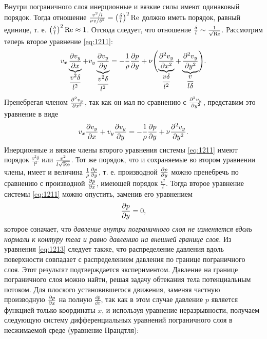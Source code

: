 	Внутри пограничного слоя инерционные и вязкие силы имеют одинаковый порядок. Тогда отношение $\frac{v^2/l}{\nu v/\delta^2} = \left(\frac{\delta}{l}\right)^2\mathrm{Re}$ должно иметь порядок, равный единице, т. е. $\left(\frac{\delta}{l}\right)^2\mathrm{Re} \approx 1$. Отсюда следует, что отношение $\frac{\delta}{l} \sim \frac{1}{\sqrt{\mathrm{Re}}}$.\n
	Рассмотрим теперь второе уравнение \eqref{eq:1211}:
	\begin{gather*}
		v_x\underbrace{\frac{\partial v_y}{\partial x}}_{\dfrac{v^2\delta}{l^2}} + v_y\underbrace{\frac{\partial v_y}{\partial y}}_{\dfrac{v^2\delta}{l^2}} = -\frac{1}{\rho}\frac{\partial p}{\partial y} + \nu\Biggl(\underbrace{\frac{\partial^2 v_y}{\partial x^2}}_{\dfrac{v\delta}{l^2}} + \underbrace{\frac{\partial^2 v_y}{\partial y^2}}_{\dfrac{v}{l\delta}}\Biggr).
	\end{gather*}\n
	Пренебрегая членом $\frac{\partial^2 v_y}{\partial x^2}$, так как он мал по сравнению с $\frac{\partial^2 v_y}{\partial y^2}$, представим это уравнение в виде
	\begin{gather}\label{eq:1212}
		v_x\frac{\partial v_y}{\partial x} + v_y\frac{\partial v_y}{\partial y} = -\frac{1}{\rho}\frac{\partial p}{\partial y} + \nu\frac{\partial^2 v_y}{\partial y^2}.
	\end{gather}\n
	Инерционные и вязкие члены второго уравнения системы \eqref{eq:1211} имеют порядок $\frac{v^2\delta}{l^2}$ или $\frac{v^2}{l\sqrt{\mathrm{Re}}}$.\n
	Тот же порядок, что и сохраняемые во втором уравнении члены, имеет и величина $\frac{1}{\rho}\frac{\partial p}{\partial y}$, т. е. производной $\frac{\partial p}{\partial y}$ можно пренебречь по сравнению с производной $\frac{\partial p}{\partial x}$, имеющей порядок $\frac{v^2}{l}$. Тогда второе уравнение системы \eqref{eq:1211} можно опустить, заменив его уравнением
	\begin{gather}\label{eq:1213}
		\frac{\partial p}{\partial y} = 0,
	\end{gather}
	которое означает, что \textit{давление внутри пограничного слоя не изменяется вдоль нормали к контуру тела и равно давлению на внешней границе слоя}.\n
	Из уравнения \eqref{eq:1213} следует также, что распределение давления вдоль поверхности совпадает с распределением давления по границе пограничного слоя. Этот результат подтверждается экспериментом. Давление на границе пограничного слоя можно найти, решая задачу обтекания тела потенциальным потоком.\n
	Для плоского установившегося движения, заменяя частную производную $\frac{\partial p}{\partial x}$ на полную $\frac{\dd p}{\dd x}$, так как в этом случае давление $p$ является функцией только координаты $x$, и используя уравнение неразрывности, получаем следующую систему дифференциальных уравнений пограничного слоя в несжимаемой среде (уравнение Прандтля):
